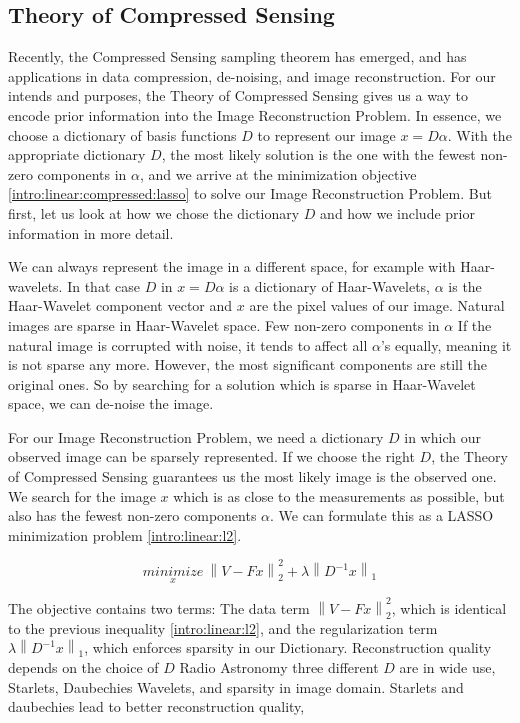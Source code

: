 \subsection{Theory of Compressed Sensing}
Recently, the Compressed Sensing sampling theorem has emerged\cite{candes2006robust, donoho2006compressed}, and has applications in data compression, de-noising\cite{zhu2009new}, and image reconstruction. For our intends and purposes, the Theory of Compressed Sensing gives us a way to encode prior information into the Image Reconstruction Problem. In essence, we choose a dictionary of basis functions $D$ to represent our image $x = D\alpha$. With the appropriate dictionary $D$, the most likely solution is the one with the fewest non-zero components in $\alpha$, and we arrive at the minimization objective \eqref{intro:linear:compressed:lasso} to solve our Image Reconstruction Problem. But first, let us look at how we chose the dictionary $D$ and how we include prior information in more detail.

We can always represent the image in a different space, for example with Haar-wavelets. In that case $D$ in $x = D\alpha$ is a dictionary of Haar-Wavelets, $\alpha$ is the Haar-Wavelet component vector and $x$ are the pixel values of our image. 
Natural images are sparse in Haar-Wavelet space. Few non-zero components in $\alpha$
If the natural image is corrupted with noise, it tends to affect all $\alpha$'s equally, meaning it is not sparse any more. However, the most significant components are still the original ones. So by searching for a solution which is sparse in Haar-Wavelet space, we can de-noise the image.

For our Image Reconstruction Problem, we need a dictionary $D$ in which our observed image can be sparsely represented.
If we choose the right $D$, the Theory of Compressed Sensing guarantees us the most likely image is the observed one.
We search for the image $x$ which is as close to the measurements as possible, but also has the fewest non-zero components $\alpha$. We can formulate this as a LASSO minimization problem \eqref{intro:linear:l2}.

\begin{equation}\label{intro:linear:compressed:lasso}
\underset{x}{minimize} \: \left \| V - Fx \right \|_2^2 + \lambda \left \| D^{-1}x \right \|_1 
\end{equation}

The objective contains two terms: The data term $\left \| V - Fx \right \|_2^2$, which is identical to the previous inequality \eqref{intro:linear:l2}, and the regularization term $\lambda \left \| D^{-1}x \right \|_1$, which enforces sparsity in our Dictionary.
Reconstruction quality depends on the choice of $D$
Radio Astronomy three different $D$ are in wide use, Starlets, Daubechies Wavelets, and sparsity in image domain.
Starlets and daubechies lead to better reconstruction quality, 

